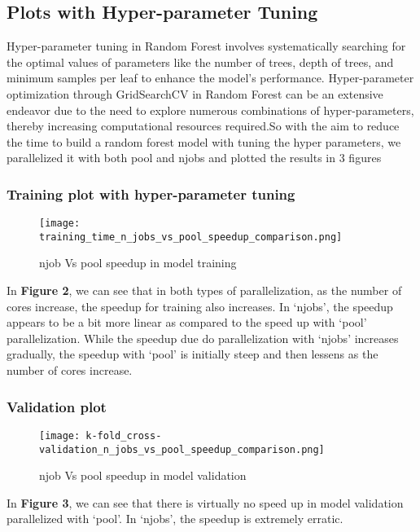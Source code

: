 \documentclass{article}
\begin{document}
\subsection{Plots with Hyper-parameter Tuning}
Hyper-parameter tuning in Random Forest involves systematically searching for the optimal values of parameters like the number of trees, depth of trees, and minimum samples per leaf to enhance the model's performance. Hyper-parameter optimization through GridSearchCV in Random Forest can be an extensive endeavor due to the need to explore numerous combinations of hyper-parameters, thereby increasing computational resources required.So with the aim to reduce the time to build a random forest model with tuning the hyper parameters, we parallelized it with both pool and n\textunderscore{}jobs and plotted the results in 3 figures

\subsubsection{Training plot with hyper-parameter tuning}
\begin{figure}[h]
    \centering
    \texttt{[image: training\_time\_n\_jobs\_vs\_pool\_speedup\_comparison.png]}
    \caption{n\textunderscore{}job Vs pool speedup in model training}
    \label{fig:imagea}
\end{figure}
In \textbf{Figure 2}, we can see that in both types of parallelization, as the number of cores increase, the speedup for training also increases. In `n\textunderscore{}jobs', the speedup appears to be a bit more linear as compared to the speed up with `pool' parallelization. While the speedup due do parallelization with `n\textunderscore{}jobs' increases gradually, the speedup with `pool' is initially steep and then lessens as the number of cores increase.

\subsubsection{Validation plot}
\begin{figure}[H]
    \centering
    \texttt{[image: k-fold\_cross-validation\_n\_jobs\_vs\_pool\_speedup\_comparison.png]}
    \caption{n\textunderscore{}job Vs pool speedup in model validation}
    \label{fig:enter-label}
\end{figure}
In \textbf{Figure 3}, we can see that there is virtually no speed up in model validation parallelized with `pool'. In `n\textunderscore{}jobs', the speedup is extremely erratic. 
\end{document}

